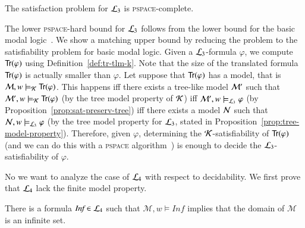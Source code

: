 \begin{thm}
The satisfaction problem for $\mathcal{L}_3$ is \textsc{pspace}-complete.
\end{thm}
\begin{pf}
The lower \textsc{pspace}-hard bound for $\mathcal{L}_3$ follows from the
lower bound for the basic modal logic~\cite{BRV01}. We show a
matching upper bound by reducing the problem to the satisfiability
problem for basic modal logic. Given a $\mathcal{L}_3$-formula $\varphi$, we
compute ${\sf Tr}(\varphi)$ using Definition~\ref{def:tr-tlm-k}. Note
that the size of the translated formula ${\sf Tr}(\varphi)$ is actually
smaller than $\varphi$. Let suppose that ${\sf Tr}(\varphi)$ has a model,
that is $\mathcal{M}, w \models_{\mathcal{K}} {\sf Tr}(\varphi)$. This happens iff
there exists a tree-like model $\mathcal{M}'$ such that $\mathcal{M}', w
\models_{\mathcal{K}} {\sf Tr}(\varphi)$ (by the tree model property of $\mathcal{K}$)
iff $\mathcal{M}', w \models_{\mathcal{L}_3} \varphi$ (by
Proposition~\ref{prop:sat-preserv-tree}) iff there exists a model
$\mathcal{N}$ such that $\mathcal{N},w \models_{\mathcal{L}_3} \varphi$ (by the tree
model property for $\mathcal{L}_3$, stated in
Proposition~\ref{prop:tree-model-property}). Therefore, given
$\varphi$, determining the $\mathcal{K}$-satisfiability of ${\sf Tr}(\varphi)$
(and we can do this with a \textsc{pspace} algorithm~\cite{BRV01})
is enough to decide the $\mathcal{L}_3$-satisfiability of $\varphi$.
\end{pf}



No we want to analyze the case of $\mathcal{L}_4$ with respect to
decidability. We first prove that $\mathcal{L}_4$ lack the finite model
property.

\begin{thm}\label{thm:infinite_model}
There is a formula $\textit{Inf} \in \mathcal{L}_4$ such that $\mathcal{M},w
\models \textit{Inf}$ implies that the domain of $\mathcal{M}$ is an
infinite set.
\end{thm}


